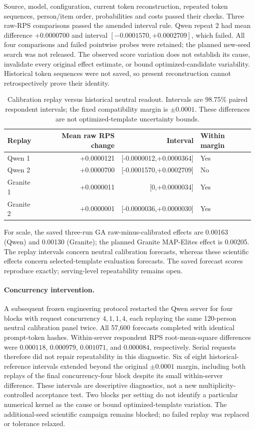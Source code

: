 \documentclass[10pt,twocolumn]{article}
\begin{document}
Source, model, configuration, current token reconstruction, repeated token
sequences, person/item order, probabilities and costs passed their checks.
Three raw-RPS comparisons passed the amended interval rule. Qwen repeat 2
had mean difference $+0.0000700$ and interval $[-0.0001570,+0.0002709]$,
which failed. All four comparisons and failed pointwise probes were retained;
the planned new-seed search was not released. The observed score variation
does not establish its cause, invalidate every original effect estimate, or
bound optimized-candidate variability. Historical token sequences were not
saved, so present reconstruction cannot retrospectively prove their identity.

\begin{table}[H]\centering\small
\caption{Calibration replay versus historical neutral readout. Intervals are
98.75\% paired respondent intervals; the fixed compatibility margin is
$\pm0.0001$. These differences are not optimized-template uncertainty bounds.}
\begin{tabular}{@{}lrrl@{}}\toprule
Replay & Mean raw RPS change & Interval & Within margin\\\midrule
Qwen 1 & +0.0000121 & [-0.0000012,+0.0000364] & Yes\\
Qwen 2 & +0.0000700 & [-0.0001570,+0.0002709] & No\\
Granite 1 & +0.0000011 & [0,+0.0000034] & Yes\\
Granite 2 & +0.0000001 & [-0.0000036,+0.0000030] & Yes\\\bottomrule
\end{tabular}\end{table}
For scale, the saved three-run GA raw-minus-calibrated effects are 0.00163
(Qwen) and 0.00130 (Granite); the planned Granite MAP-Elites effect is 0.00205.
The replay intervals concern neutral calibration forecasts, whereas these
scientific effects concern selected-template evaluation forecasts. The saved
forecast scores reproduce exactly; serving-level repeatability remains open.

\paragraph{Concurrency intervention.}
A subsequent frozen engineering protocol restarted the Qwen server for four
blocks with request concurrency $4,1,1,4$, each replaying the same 120-person
neutral calibration panel twice. All 57,600 forecasts completed with identical
prompt-token hashes. Within-server respondent RPS root-mean-square differences
were $0.000118$, $0.000979$, $0.001071$, and $0.000084$, respectively.
Serial requests therefore did not repair repeatability in this diagnostic.
Six of eight historical-reference intervals extended beyond the original
$\pm0.0001$ margin, including both replays of the final concurrency-four block
despite its small within-server difference. These intervals are descriptive
diagnostics, not a new multiplicity-controlled acceptance test. Two blocks per
setting do not identify a particular numerical kernel as the cause or bound
optimized-template variation. The additional-seed scientific campaign remains
blocked; no failed replay was replaced or tolerance relaxed.
\end{document}
